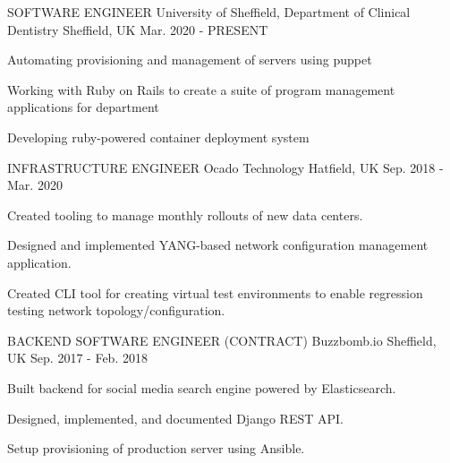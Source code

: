 

\begin{cventries}

\cventry
{SOFTWARE ENGINEER} %
{University of Sheffield, Department of Clinical Dentistry} %
{Sheffield, UK} %
{Mar. 2020 - PRESENT} %
{
    \begin{cvitems} %
    \item{Automating provisioning and management of servers using puppet}
    \item{Working with Ruby on Rails to create a suite of program management applications for department}
    \item{Developing ruby-powered container deployment system}
    \end{cvitems}
}

\cventry
{INFRASTRUCTURE ENGINEER} %
{Ocado Technology} %
{Hatfield, UK} %
{Sep. 2018 - Mar. 2020} %
{
    \begin{cvitems} %
    \item{Created tooling to manage monthly rollouts of new data centers.}
    \item{Designed and implemented YANG-based network configuration management application.}
    \item{Created CLI tool for creating virtual test environments to enable regression testing network topology/configuration.}
    \end{cvitems}
}

\cventry
{BACKEND SOFTWARE ENGINEER (CONTRACT)} %
{Buzzbomb.io} %
{Sheffield, UK} %
{Sep. 2017 - Feb. 2018} %
{
    \begin{cvitems}
    \item{Built backend for social media search engine powered by Elasticsearch.}
    \item{Designed, implemented, and documented Django REST API.}
    \item{Setup provisioning of production server using Ansible.}
    \end{cvitems}
}


\end{cventries}
